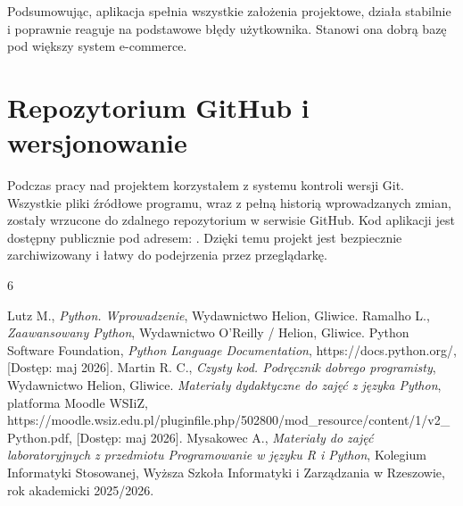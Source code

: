 \documentclass[polish,12pt,oneside,a4paper]{report}
\begin{document}
Podsumowując, aplikacja spełnia wszystkie założenia projektowe, działa stabilnie i poprawnie reaguje na podstawowe błędy użytkownika. Stanowi ona dobrą bazę pod większy system e-commerce.

\section{Repozytorium GitHub i wersjonowanie}
Podczas pracy nad projektem korzystałem z systemu kontroli wersji Git. Wszystkie pliki źródłowe programu, wraz z pełną historią wprowadzanych zmian, zostały wrzucone do zdalnego repozytorium w serwisie GitHub. Kod aplikacji jest dostępny publicznie pod adresem: \texttt
{}. Dzięki temu projekt jest bezpiecznie zarchiwizowany i łatwy do podejrzenia przez przeglądarkę.

\newpage
\begin{thebibliography}{6}

 Lutz M., \textit{Python. Wprowadzenie}, Wydawnictwo Helion, Gliwice.
 Ramalho L., \textit{Zaawansowany Python}, Wydawnictwo O'Reilly / Helion, Gliwice.
 Python Software Foundation, \textit{Python Language Documentation}, https://docs.python.org/, [Dostęp: maj 2026].
 Martin R. C., \textit{Czysty kod. Podręcznik dobrego programisty}, Wydawnictwo Helion, Gliwice.
 \textit{Materiały dydaktyczne do zajęć z języka Python}, platforma Moodle WSIiZ, https://moodle.wsiz.edu.pl/pluginfile.php/502800/mod\_resource/content/1/v2\_Python.pdf, [Dostęp: maj 2026].
 Mysakowec A., \textit{Materiały do zajęć laboratoryjnych z przedmiotu Programowanie w języku R i Python}, Kolegium Informatyki Stosowanej, Wyższa Szkoła Informatyki i Zarządzania w Rzeszowie, rok akademicki 2025/2026.

\end{thebibliography}

\newpage


\end{document}

